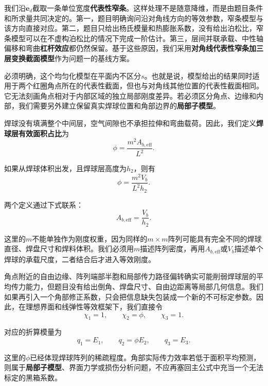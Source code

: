 \documentclass[draft,12pt,a4paper]{ctexart}
\theoremstyle{definition}
\begin{document}
我们沿$\mathbf{e}_d$截取一条单位宽度\textbf{代表性窄条}。这样处理不是随意降维，而是由题目条件和所求量共同决定的。第一，题目明确询问沿对角线方向的等效参数，窄条模型与该方向直接对应。第二，题目只给出杨氏模量和热膨胀系数，没有给出泊松比，窄条模型可以在不虚构泊松比的情况下完成一阶估计。第三，层间并联承载、中性轴偏移和弯曲\textbf{杠杆效应}都仍然保留。基于这些原因，我们采用\textbf{对角线代表性窄条加三层变换截面模型}作为问题一的基线方案。

必须明确，这个均匀化模型在平面内不区分$s$。也就是说，模型给出的结果同时适用于两个红圈角点所在的代表性截面，但也与对角线其他位置的代表性截面相同。它无法刻画角点相对于内部区域的独立局部刚度差异。若必须区分角点、边缘和内部，我们需要另外建立保留真实焊球位置和角部边界的\textbf{局部子模型}。


焊球没有填满整个中间层，空气间隙也不承担拉伸和弯曲载荷。因此，我们定义\textbf{焊球层有效面积占比}为
\begin{equation}\label{eq:phi}
\phi=\frac{m^2 A_{b,\mathrm{eff}}}{L^2}.
\end{equation}

如果从焊球体积出发，且焊球层高度为$h_2$，则有
\begin{equation}\label{eq:phi-vol}
\phi=\frac{m^2 V_b}{L^2 h_2}.
\end{equation}

两个定义通过下式联系：
\begin{equation}
A_{b,\mathrm{eff}}=\frac{V_b}{h_2}.
\end{equation}

这里的$m$不能单独作为刚度权重，因为同样的$m \times m$阵列可能具有完全不同的焊球直径、焊盘尺寸和焊料体积。我们必须用$m$描述阵列密度，再用$A_{b,\mathrm{eff}}$或$V_b$描述单个焊球的承载尺度，二者结合后才进入等效刚度。

角点附近的自由边缘、阵列端部半胞和局部传力路径偏转确实可能削弱焊球层的平均传力能力，但题目没有给出倒角、焊盘尺寸、自由边距离等局部几何信息。我们如果再引入一个角部修正系数，只会把信息缺失包装成一个新的不可标定参数。因此，在理想界面和线弹性等效框架下，我们直接令
\begin{equation}\label{eq:chi}
\chi_1=1,\qquad \chi_2=\phi,\qquad \chi_3=1.
\end{equation}

对应的折算模量为
\begin{equation}\label{eq:q}
q_1=E_1,\qquad q_2=\phi E_2,\qquad q_3=E_3.
\end{equation}

这里的$\phi$已经体现焊球阵列的稀疏程度。角部实际传力效率若低于面积平均预测，则属于\textbf{局部子模型}、界面力学或损伤分析问题，不应再塞回主公式中充当一个无法标定的黑箱系数。
\end{document}
